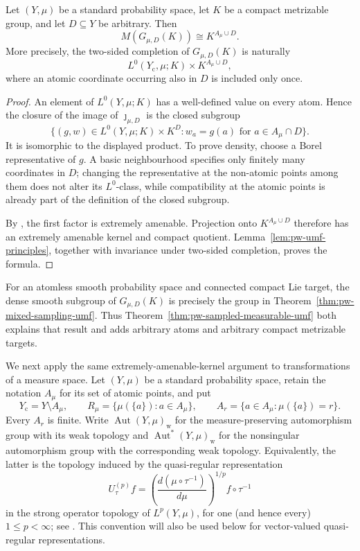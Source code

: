 \begin{theorem}\label{thm:pw-sampled-measurable-umf}
Let \((Y,\mu)\) be a standard probability space, let \(K\) be a compact
metrizable group, and let \(D\subseteq Y\) be arbitrary. Then
\[
 M(G_{\mu,D}(K))\cong K^{A_\mu\cup D}.
\]
More precisely, the two-sided completion of \(G_{\mu,D}(K)\) is naturally
\[
 L^0(Y_{\mathrm c},\mu;K)\times K^{A_\mu\cup D},
\]
where an atomic coordinate occurring also in \(D\) is included only once.
\end{theorem}

\begin{proof}
An element of \(L^0(Y,\mu;K)\) has a well-defined value on every atom. Hence
the closure of the image of \(\jmath_{\mu,D}\) is the closed subgroup
\[
 \{(g,w)\in L^0(Y,\mu;K)\times K^D:
        w_a=g(a)\text{ for }a\in A_\mu\cap D\}.
\]
It is isomorphic to the displayed product. To prove density, choose a Borel
representative of \(g\). A basic neighbourhood specifies only finitely many
coordinates in \(D\); changing the representative at the non-atomic points
among them does not alter its \(L^0\)-class, while compatibility at the atomic
points is already part of the definition of the closed subgroup.

By \cite[Theorem~1.1]{PestovSchneider2017}, the first factor is extremely amenable. Projection
onto \(K^{A_\mu\cup D}\) therefore has an extremely amenable kernel and compact
quotient. Lemma~\ref{lem:pw-umf-principles}, together with invariance under
two-sided completion, proves the formula.
\end{proof}

For an atomless smooth probability space and connected compact Lie target, the
dense smooth subgroup of \(G_{\mu,D}(K)\) is precisely the group in
Theorem~\ref{thm:pw-mixed-sampling-umf}. Thus
Theorem~\ref{thm:pw-sampled-measurable-umf} both explains that result and adds
arbitrary atoms and arbitrary compact metrizable targets.

We next apply the same extremely-amenable-kernel argument to transformations of
a measure space. Let \((Y,\mu)\) be a standard probability space, retain the
notation \(A_\mu\) for its set of atomic points, and put
\[
Y_{\mathrm c}=Y\setminus A_\mu,
\qquad
R_\mu=\{\mu(\{a\}):a\in A_\mu\},
\qquad
A_r=\{a\in A_\mu:\mu(\{a\})=r\}.
\]
Every \(A_r\) is finite. Write \(\operatorname{Aut}(Y,\mu)_{\mathrm w}\) for the
measure-preserving automorphism group with its weak topology and
\(\operatorname{Aut}^*(Y,\mu)_{\mathrm w}\) for the nonsingular automorphism group with
the corresponding weak topology. Equivalently, the latter is the topology
induced by the quasi-regular representation
\[
 U_\tau^{(p)}f=
 \left(\frac{d(\mu\circ\tau^{-1})}{d\mu}\right)^{1/p}
 f\circ\tau^{-1}
\]
in the strong operator topology of \(L^p(Y,\mu)\), for one (and hence every)
\(1\leq p<\infty\); see \cite[Section~6.2]{GiordanoPestov2007}. This convention will also
be used below for vector-valued quasi-regular representations.

